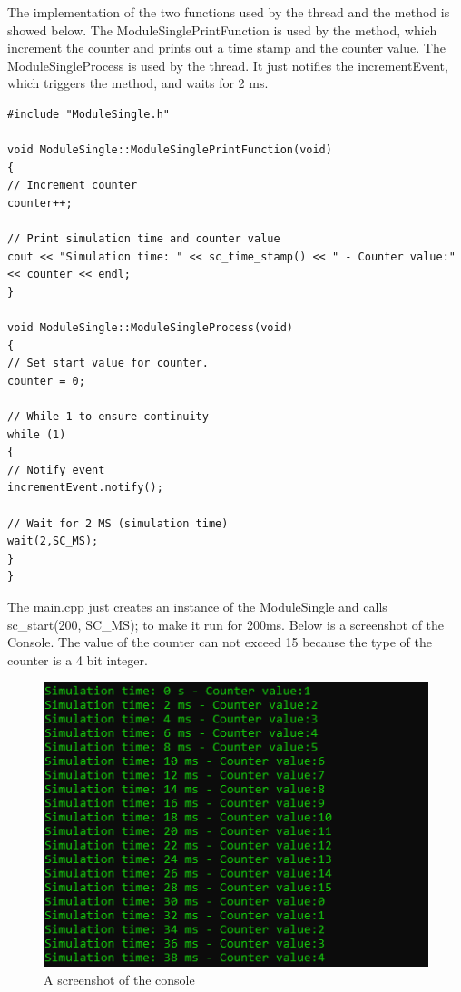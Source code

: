 The implementation of the two functions used by the thread and the method is showed below. 
The ModuleSinglePrintFunction is used by the method, which increment the counter and prints out a time stamp and the counter value.
The ModuleSingleProcess  is used by the thread. It just notifies the incrementEvent, which triggers the method, and waits for 2 ms. 

\begin{lstlisting}
#include "ModuleSingle.h"

void ModuleSingle::ModuleSinglePrintFunction(void)
{
// Increment counter
counter++;

// Print simulation time and counter value
cout << "Simulation time: " << sc_time_stamp() << " - Counter value:" << counter << endl;
}

void ModuleSingle::ModuleSingleProcess(void)
{
// Set start value for counter.
counter = 0;

// While 1 to ensure continuity
while (1)
{
// Notify event
incrementEvent.notify();

// Wait for 2 MS (simulation time)
wait(2,SC_MS);
}
}
\end{lstlisting}


The main.cpp just creates an instance of the ModuleSingle and calls sc\_start(200, SC\_MS); to make it run for 200ms. 
Below is a screenshot of the Console. The value of the counter can not exceed 15 because the type of the counter is a 4 bit integer.

\begin{figure}[H]
	\centering
	\includegraphics[width=\textwidth]{Images/ConsoleWindow3_1.png}
	\caption{A screenshot of the console}
	\label{fig:ConsoleWindow_3_1}
\end{figure}


